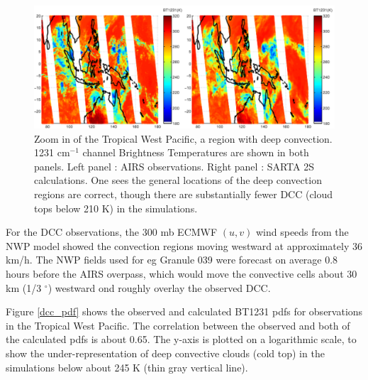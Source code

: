 \documentclass[agupp]{aguplus}              %
\newcommand{\wn}{cm$^{-1}$\xspace}
\newcommand{\mydeg}{\mbox{$^\circ$}}
\begin{document}
\begin{article}
\begin{figure} \center
\noindent\includegraphics[width=\textwidth]{FIGS/dcc_twp_obs_sartaV2.pdf}
\caption{Zoom in of the Tropical West Pacific, a region with deep convection. 
          1231 \wn channel Brightness Temperatures are shown in both panels. 
          Left panel : AIRS observations. Right panel : SARTA 2S calculations.
          One sees the general locations of the deep convection regions are correct,
          though there are substantially fewer DCC (cloud tops below 210 K) in the
          simulations.}
\label{dcc_obs_sarta}
\end{figure}


For the DCC observations, the 300 mb ECMWF $(u,v)$ wind speeds from
the NWP model showed the convection regions moving westward at
approximately 36 km/h.  The NWP fields used for eg Granule 039 were
forecast on average 0.8 hours before the AIRS overpass, which would
move the convective cells about 30 km (1/3 \mydeg) westward ond
roughly overlay the observed DCC.

Figure \ref{dcc_pdf} shows the observed and calculated BT1231 pdfs for
observations in the Tropical West Pacific. The correlation between the
observed and both of the calculated pdfs is about 0.65. The y-axis is plotted
on a logarithmic scale, to show the under-representation of
deep convective clouds (cold top) in the simulations below about 245 K 
(thin gray vertical line).


\end{article}
\end{document}
